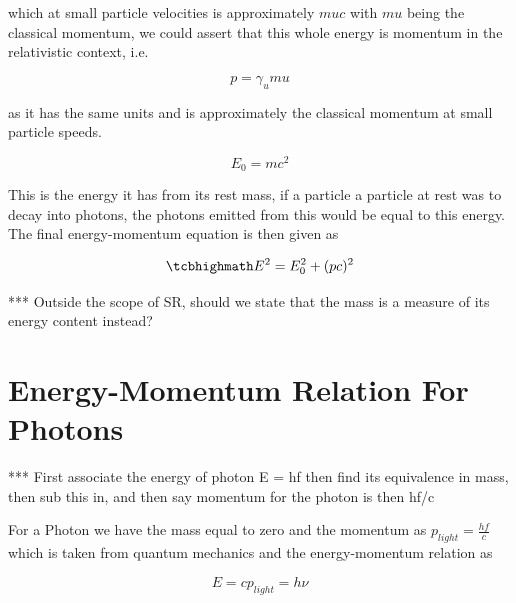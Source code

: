 which at small particle velocities is approximately ${m}{u}{c}$ with ${m}{u}$ being the classical momentum, we could assert that this whole energy is momentum in the relativistic context, i.e.

\begin{equation}
	p = \gamma_{u} {m}{u}
\end{equation}

as it has the same units and is approximately the classical momentum at small particle speeds.

\begin{equation}
	E_0 = {m}{c}^2
\end{equation}

This is the energy it has from its rest mass, if a particle a particle at rest was to decay into photons, the photons emitted from this would be equal to this energy.
The final energy-momentum equation is then given as

\begin{equation}
	\mhl{
		E^2 = E_0^2 + (pc)^2
	}
\end{equation}

*** Outside the scope of SR, should we state that the mass is a measure of its energy content instead?



\section{Energy-Momentum Relation For Photons} \label{sect: Energy-Momentum Relation For Photons}

*** First associate the energy of photon E = hf then find its equivalence in mass, then sub this in, and then say momentum for the photon is then hf/c

For a Photon we have the mass equal to zero and the momentum as $p_{light} = \frac{hf}{c}$ which is taken from quantum mechanics and the energy-momentum relation as

\begin{equation}
	E ={c}p_{light} = h \nu
\end{equation}

